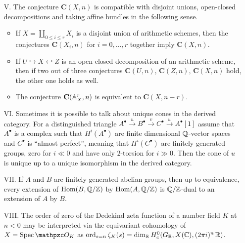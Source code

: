 \documentclass{article}
\begin{document}
\begin{enumerate}
\item[V.] The conjecture $\mathbf{C} (X,n)$ is compatible with disjoint unions,
  open-closed decompositions and taking affine bundles in the following sense.

  \begin{itemize}
  \item If $X = \coprod_{0 \le i \le r} X_i$ is a disjoint union of arithmetic
    schemes, then the conjectures $\mathbf{C} (X_i, n)$ for $i = 0,\ldots,r$
    together imply $\mathbf{C} (X, n)$.

  \item If $U \hookrightarrow X \hookleftarrow Z$ is an open-closed decomposition
    of an arithmetic scheme, then if two out of three conjectures
    $\mathbf{C} (U, n)$, $\mathbf{C} (Z, n)$, $\mathbf{C} (X, n)$ hold, the
    other one holds as well.

  \item The conjecture $\mathbf{C} (\AA^r_X,n)$ is equivalent to
    $\mathbf{C} (X,n-r)$.
  \end{itemize}

\item[VI.] Sometimes it is possible to talk about unique cones in the derived
  category. For a distinguished triangle
  $A^\bullet \xrightarrow{u} B^\bullet \xrightarrow{v} C^\bullet \xrightarrow{w} A^\bullet[1]$
  assume that $A^\bullet$ is a complex such that $H^i (A^\bullet)$ are finite
  dimensional $\QQ$-vector spaces and $C^\bullet$ is ``almost perfect'', meaning
  that $H^i (C^\bullet)$ are finitely generated groups, zero for $i \ll 0$ and
  have only $2$-torsion for $i \gg 0$. Then the cone of $u$ is unique up to a
  unique isomorphism in the derived category.

\item[VII.] If $A$ and $B$ are finitely generated abelian groups, then up to
  equivalence, every extension of $\Hom (B,\QQ/\ZZ)$ by $\Hom (A,\QQ/\ZZ)$ is
  $\QQ/\ZZ$-dual to an extension of $A$ by $B$.

\item[VIII.] The order of zero of the Dedekind zeta function of a number field
  $K$ at $n < 0$ may be interpreted via the equivariant cohomology of
  $X = \Spec \O_K$ as
  $\ord_{s = n} \zeta_K (s) = \dim_\RR H^0_c (G_\RR, X (\CC), (2\pi i)^n\,\RR)$.
\end{enumerate}
\end{document}
